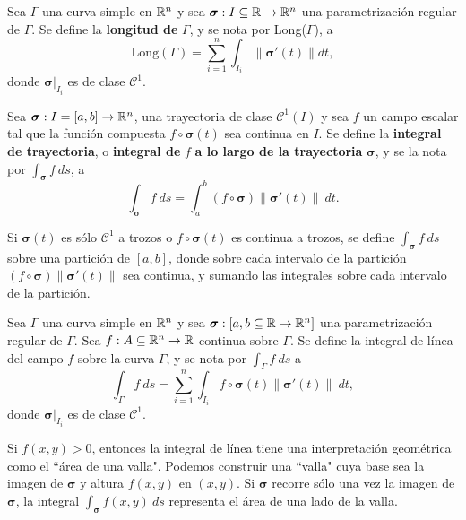 \begin{definition}
    Sea $\Gamma$ una curva simple en $\mathbb{R}^n$ y sea $\boldsymbol{\sigma}:I\subseteq\mathbb{R}\to\mathbb{R}^n$ una parametrizaci\'on regular de $\Gamma$. Se define la \textbf{longitud de} $\Gamma$, y se nota por Long($\Gamma$), a 
    \[
        \text{Long}(\Gamma)=\sum_{i=1}^{n}\int_{I_i}\|\boldsymbol{\sigma}'(t)\|dt,    
    \]
    donde $\boldsymbol{\sigma}\lvert_{I_i}$ es de clase $\mathcal{C}^1$.
\end{definition}

\begin{definition}
    Sea $\boldsymbol{\sigma}:I=[a,b]\to\mathbb{R}^n$, una trayectoria de clase $\mathcal{C}^1(I)$ y sea $f$ un campo escalar tal que la funci\'on compuesta $f\circ\boldsymbol{\sigma}(t)$ sea continua en $I$. Se define la \textbf{integral de trayectoria}, o \textbf{integral de} $f$ \textbf{a lo largo de la trayectoria} $\boldsymbol{\sigma}$, y se la nota por $\int_{\boldsymbol{\sigma}}f\:ds$, a
    \[
        \int_{\boldsymbol{\sigma}}f\:ds=\int_a^b (f\circ\boldsymbol{\sigma})\|\boldsymbol{\sigma}'(t)\|\:dt.
    \]
\end{definition}

Si $\boldsymbol{\sigma}(t)$ es s\'olo $\mathcal{C}^1$ a trozos o $f\circ\boldsymbol{\sigma}(t)$ es continua a trozos, se define $\int_{\boldsymbol{\sigma}}f\:ds$ sobre una partici\'on de $[a,b]$, donde sobre cada intervalo de la partici\'on $(f\circ\boldsymbol{\sigma})\|\boldsymbol{\sigma}'(t)\|$ sea continua, y sumando las integrales sobre cada intervalo de la partici\'on. 

\begin{definition}
    Sea $\Gamma$ una curva simple en $\mathbb{R}^n$ y sea $\boldsymbol{\sigma}:[a,b\subseteq\mathbb{R}\to\mathbb{R}^n]$ una parametrizaci\'on regular de $\Gamma$. Sea $f:A\subseteq\mathbb{R}^n\to\mathbb{R}$ continua sobre $\Gamma$. Se define la integral de l\'inea del campo $f$ sobre la curva $\Gamma$, y se nota por $\int_{\Gamma}f\:ds$ a
    \[
        \int_{\Gamma}f\:ds=\sum_{i=1}^{n}\int_{I_i}f\circ\boldsymbol{\sigma}(t)\|\boldsymbol{\sigma}'(t)\|\:dt,  
    \]
    donde $\boldsymbol{\sigma}\lvert_{I_i}$ es de clase $\mathcal{C}^1$.
\end{definition}

\begin{obs} 
Si $f(x,y)>0$, entonces la integral de l\'inea tiene una interpretaci\'on geom\'etrica como el ``\'area de una valla". Podemos construir una ``valla" cuya base sea la imagen de $\boldsymbol{\sigma}$ y altura $f(x,y)$ en $(x,y)$. Si $\boldsymbol{\sigma}$ recorre s\'olo una vez la imagen de $\boldsymbol{\sigma}$, la integral $\int_{\boldsymbol{\sigma}}f(x,y)\:ds$ representa el \'area de una lado de la valla.
\end{obs}

